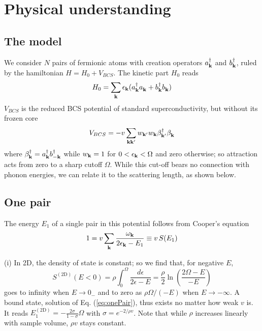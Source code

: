 \documentclass[5p,twocolumn]{elsarticle}
\begin{document}
\section{Physical understanding}
\subsection{The model\label{sec:model}}
We consider $N$ pairs of fermionic atoms with creation operators $a_{\mathbf{k}}^\dagger$ and $b_{\mathbf{k}}^\dagger$, ruled by the hamiltonian
$H=H_{0}+V_{BCS}$. The kinetic part $H_0$ reads 
\begin{equation}
H_0=\sum_{\mathbf{k}}\epsilon_{\mathbf{k}}(a^\dagger_{\mathbf{k}}{}a^{}_{\mathbf{k}}+b^\dagger_{\mathbf{k}}{}b^{}_{\mathbf{k}})
\label{eq:}
\end{equation}
 $V_{BCS}$ is the reduced BCS potential of standard superconductivity, but without its frozen core
\begin{equation}
V_{BCS}=-v\sum_{\mathbf{k}\mathbf{k}'}w_{\mathbf{k}'}w_{\mathbf{k}}\beta^\dagger_{\mathbf{k}'}{}\beta^{}_{\mathbf{k}}
\label{eq:VBcs}
\end{equation}
 where $\beta^\dagger_{\mathbf{k}}=a^\dagger_{\mathbf{k}}b^\dagger_{-\mathbf{k}}$ while $w_{\mathbf{k}}=1$ for $0<\epsilon_{\mathbf{k}}<\Omega$ and zero otherwise; so attraction acts from zero to a sharp cutoff $\Omega$. While this cut-off bears no connection with phonon energies, we can relate it to the scattering length, as shown below.
 \subsection{One pair\label{sec:onePair}}
The energy $E_1$ of a single pair in this potential follows from Cooper's equation
\begin{equation}
1=v\sum_{\mathbf{k}}\frac{\omega_{\mathbf{k}}}{2\epsilon_{\mathbf{k}}-E_1}\equiv{}v\,S(E_1)
\label{eq:onePair}
\end{equation}

(i) In 2D, the density of state is constant; so we find that, for negative $E$, 
\begin{equation}
S^{(\text{2D})}(E<0)=\rho\int_0^{\Omega}\frac{d\epsilon}{2\epsilon-E}=\frac{\rho}{2}\ln\left(\frac{2\Omega-E}{-E}\right)
\label{eq:s1pair}
\end{equation}
goes to infinity when $E\rightarrow{}0_{-}$ and to zero as $\rho\Omega/(-E)$ when $E\rightarrow-\infty$. A bound state, solution of Eq. (\ref{eq:onePair}), thus exists no matter how weak $v$ is. It reads
$
E_1^{(\text{2D})}=-\frac{2\sigma}{1-\sigma}\Omega
$
with $\sigma=e^{-2/\rho{v}}$. Note that while $\rho$ increases linearly with sample volume, $\rho{v}$ stays constant.
\end{document}
